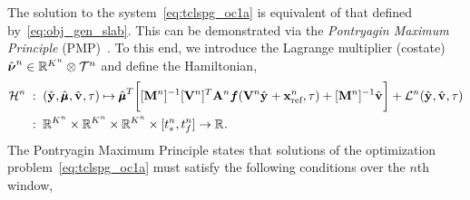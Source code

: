 The solution to the system~\eqref{eq:tclspg_oc1a} is equivalent of that defined by~\eqref{eq:obj_gen_slab}. 
This can be demonstrated via the \textit{Pontryagin Maximum Principle} (PMP)~\cite{optimal_control_book}. To this end, we introduce the Lagrange multiplier (costate) 
	$\adjointOCArgnt{n} \in \RR{\romdimArg{n}} \otimes \timeSpaceArg{n}$ and define the Hamiltonian, 
\begin{equation}\label{eq:hamiltonian}
\begin{split}
\hamiltonianArg{n} \; &: \;  (\genstateyDiscreteArgnt{},\adjointDiscreteDumArgnt{},\controllerDiscreteDumArgnt{},\timeDummy) \mapsto 
 \adjointDiscreteDumArgnt{T} \bigg[  [\massArg{n}]^{-1}\basisspaceTArg{n} \stweightingMatArgt{n}{t}\velocity(\basisspaceArg{n} \genstateyDiscreteArgnt{} + \stateInterceptArg{n},\timeDummy) + [\massArg{n}]^{-1}\controllerDiscreteDumArgnt{} \bigg] +  \objectiveControlArg{n}(\genstateyDiscreteArgnt{},\controllerDiscreteDumArgnt{},\timeDummy) \\
&: \; \RR{\romdimArg{n}} \times \RR{\romdimArg{n}} \times \RR{\romdimArg{n}} \times [\timeStartArg{n},\timeEndArg{n}] \rightarrow \RR{}.
\end{split}
\end{equation} 
The Pontryagin Maximum Principle states that solutions of the optimization problem~\eqref{eq:tclspg_oc1a} must satisfy the 
following conditions over the $n$th window,
